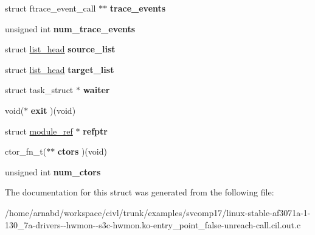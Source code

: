 \begin{DoxyCompactItemize}
\item 
\hypertarget{structmodule_a82f8319e2b2f62ebf75a4934c33c3194}{}struct ftrace\+\_\+event\+\_\+call $\ast$$\ast$ {\bfseries trace\+\_\+events}\label{structmodule_a82f8319e2b2f62ebf75a4934c33c3194}

\item 
\hypertarget{structmodule_a1fe11ec66663d24d74e525c222caba86}{}unsigned int {\bfseries num\+\_\+trace\+\_\+events}\label{structmodule_a1fe11ec66663d24d74e525c222caba86}

\item 
\hypertarget{structmodule_a9d873fdf143904fab4c6792d3d916d21}{}struct \hyperlink{structlist__head}{list\+\_\+head} {\bfseries source\+\_\+list}\label{structmodule_a9d873fdf143904fab4c6792d3d916d21}

\item 
\hypertarget{structmodule_ae4585f7dc2b03b026eb5ba5780875d6e}{}struct \hyperlink{structlist__head}{list\+\_\+head} {\bfseries target\+\_\+list}\label{structmodule_ae4585f7dc2b03b026eb5ba5780875d6e}

\item 
\hypertarget{structmodule_aa051942cabfc5f61fc7a9ef4c95fbc49}{}struct task\+\_\+struct $\ast$ {\bfseries waiter}\label{structmodule_aa051942cabfc5f61fc7a9ef4c95fbc49}

\item 
\hypertarget{structmodule_ac872fbb470d3c2482e74d3946390e8fc}{}void($\ast$ {\bfseries exit} )(void)\label{structmodule_ac872fbb470d3c2482e74d3946390e8fc}

\item 
\hypertarget{structmodule_a0f2cceec9c0db4fcbb925ba9de5c5a7c}{}struct \hyperlink{structmodule__ref}{module\+\_\+ref} $\ast$ {\bfseries refptr}\label{structmodule_a0f2cceec9c0db4fcbb925ba9de5c5a7c}

\item 
\hypertarget{structmodule_acd0cd8f03bcdc4f11d61166bc17b3efa}{}ctor\+\_\+fn\+\_\+t($\ast$$\ast$ {\bfseries ctors} )(void)\label{structmodule_acd0cd8f03bcdc4f11d61166bc17b3efa}

\item 
\hypertarget{structmodule_af0fa109e5472a318fbfbc48f201c190e}{}unsigned int {\bfseries num\+\_\+ctors}\label{structmodule_af0fa109e5472a318fbfbc48f201c190e}

\end{DoxyCompactItemize}


The documentation for this struct was generated from the following file\+:\begin{DoxyCompactItemize}
\item 
/home/arnabd/workspace/civl/trunk/examples/svcomp17/linux-\/stable-\/af3071a-\/1-\/130\+\_\+7a-\/drivers-\/-\/hwmon-\/-\/s3c-\/hwmon.\+ko-\/entry\+\_\+point\+\_\+false-\/unreach-\/call.\+cil.\+out.\+c\end{DoxyCompactItemize}
